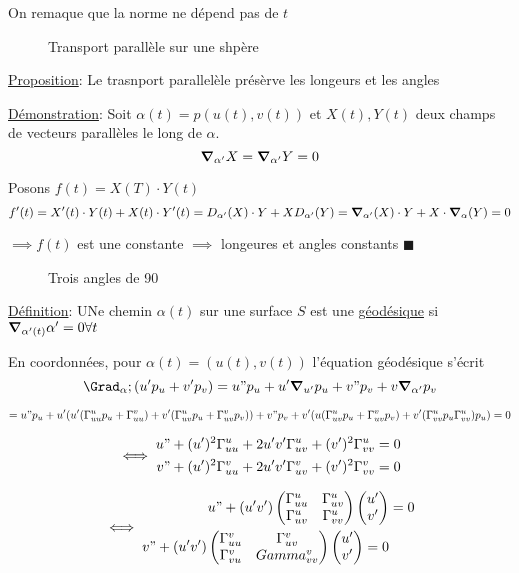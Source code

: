 On remaque que la norme ne dépend pas de $t$ 


\begin{figure}[ht]
    \centering
    \caption{Transport parallèle sur une shpère}
    \label{fig:transport-parallèle-sur-une-shpère}
\end{figure}


\underline{Proposition}: Le trasnport parallelèle présèrve les longeurs et les angles

\underline{Démonstration}: Soit $\alpha(t) = p(u(t), v(t))$ et $X(t), Y(t)$ deux champs de vecteurs parallèles le long de $\alpha$.
$$\grad_{\alpha'} X = \grad_{\alpha'} Y = 0$$ 

Posons $f(t) = X(T) \cdot Y(t)$ 
$$f'(t) = X'(t) \cdot Y(t) + X(t) \cdot Y'(t) = D_{\alpha'} (X) \cdot Y + X D_{\alpha'} (Y) = \grad_{\alpha'} (X) \cdot Y + X \cdot \grad_{\alpha} (Y) = 0$$ 

$\implies f(t)$ est une constante
$\implies$ longeures et angles constants $\blacksquare$  

\begin{figure}[ht]
    \centering
    \caption{Trois angles de 90}
    \label{fig:trois-angles-de-90}
\end{figure}

\underline{Définition}: UNe chemin $\alpha(t)$ sur une surface $S$ est une \underline{géodésique} si $\grad_{\alpha'(t)} \alpha' = 0 \forall t$    

En coordonnées, pour $\alpha(t) = (u(t), v(t))$ l'équation géodésique s'écrit $$\Grad_\alpha;(u'p_{u} + v'p_v) = u"p_{u} + u'\grad_{u'} p_{u} + v" p_{v} + v\grad_{\alpha'} p_v$$   

$$=u"p_{u} + u'(u'(\Gamma_{uu}^up_{u} + \Gamma_{uu}^v) + v'(\Gamma_{uv}^u p_{u} + \Gamma_{uv}^v p_{v} )) + v"p_{v} + v'(u(\Gamma_{uv}^up_{u} + \Gamma_{uv}^v p_{v}) + v'(\Gamma_{vv}^u p_{u} \Gamma_{vv}^u)p_u) = 0$$ 

$$\iff\begin{aligned}
	u" + (u')^2\Gamma_{uu}^u + 2u'v'\Gamma_{uv}^u + (v')^2\Gamma_{vv}^u &=0\\
	v" + (u')^2 \Gamma_{uu}^v + 2u'v'\Gamma_{uv}^v + (v')^2\Gamma_{vv}^v &= 0
\end{aligned}$$ 

$$\iff \begin{aligned}
	u" + (u' v') \begin{pmatrix} \Gamma_{uu}^u & \Gamma_{uv}^u\\ \Gamma_{uv}^u & \Gamma_{vv}^u \end{pmatrix} \begin{pmatrix} u'\\v' \end{pmatrix} &= 0\\
	v" + (u'v')\begin{pmatrix} \Gamma_{uu}^v &\Gamma_{uv}^v \\ \Gamma_{vu}^v & Gamma_{vv}^v \end{pmatrix}\begin{pmatrix} u' \\ v' \end{pmatrix} = 0
\end{aligned}$$ 


